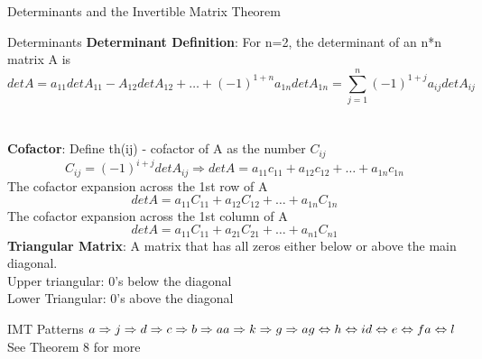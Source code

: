 \documentclass[a4paper, 12pt]{article}
\begin{document}
\begin{section}{Determinants and the Invertible Matrix Theorem}
\begin{subsection}{Determinants}
\noindent\textbf{Determinant Definition}: For n=2, 
the determinant of an n*n
matrix A is \\ 
\begin{equation}
detA=a_{11}detA_{11}-A_{12}detA_{12}+\dots+(-1)^{1+n} a_{1n}detA_{1n}=
\sum_{j=1}^{n}(-1)^{1+j}a_{ij}detA_{ij}
\end{equation}
\\ \\
\noindent\textbf{Cofactor}: Define th(ij) - cofactor of A as the number 
$C_{ij}$
\begin{equation}
	C_{ij}=(-1)^{i+j}detA_{ij} \Rightarrow
	detA= a_{11}c_{11}+a_{12}c_{12}+\dots+a_{1n}c_{1n}
\end{equation}
The cofactor expansion across the 1st row of A
\begin{equation}
detA=a_{11}C_{11}+a_{12}C_{12}+\dots+a_{1n}C_{1n}	
\end{equation}
The cofactor expansion across the 1st column of A
\begin{equation}
	detA=a_{11}C_{11}+a_{21}C_{21}+\dots+a_{n1}C_{n1}	
\end{equation}
\textbf{Triangular Matrix}: A matrix that has all zeros
either below or above the main diagonal. \\
Upper triangular: 0's below the diagonal\\
Lower Triangular: 0's above the diagonal
\end{subsection}

\begin{subsection}{IMT Patterns}
$a\Rightarrow j\Rightarrow d\Rightarrow c\Rightarrow b\Rightarrow 
a\\
a\Rightarrow k\Rightarrow g\Rightarrow a\\
g\Leftrightarrow h\Leftrightarrow i \\
d\Leftrightarrow e\Leftrightarrow f \\
a\Leftrightarrow l$
\\
See Theorem 8 for more
\end{subsection}
\end{section}
\end{document}
